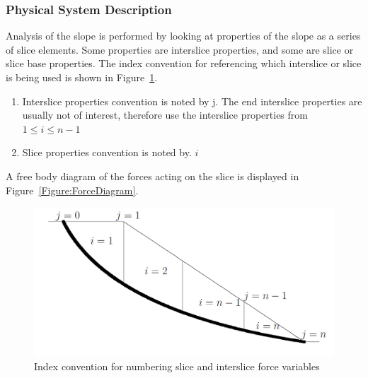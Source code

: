 \documentclass[12pt]{article}
\begin{document}
\subsubsection{Physical System Description}
\label{Sec:PhysSyst}
Analysis of the slope is performed by looking at properties of the slope as a series of slice elements. Some properties are interslice properties, and some are slice or slice base properties. The index convention for referencing which interslice or slice is being used is shown in Figure~\ref{Figure:IndexConvention}.
\begin{enumerate}
\item{Interslice properties convention is noted by j. The end interslice properties are usually not of interest, therefore use the interslice properties from $1\leq{}i\leq{}n-1$}
\item{Slice properties convention is noted by. $i$}
\end{enumerate}
A free body diagram of the forces acting on the slice is displayed in Figure~\ref{Figure:ForceDiagram}.
\begin{figure}
\begin{center}
\includegraphics[width=\textwidth]{IndexConvention.png}
\caption{Index convention for numbering slice and interslice force variables}
\label{Figure:IndexConvention}
\end{center}
\end{figure}
\end{document}
